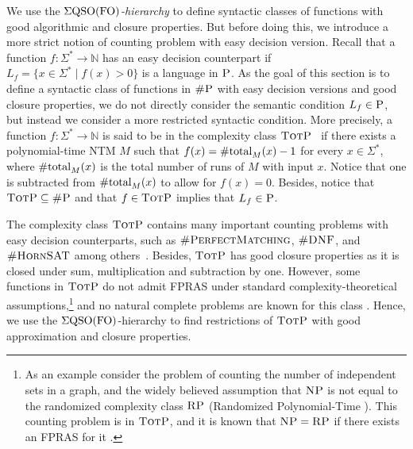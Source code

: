 
We use the \emph{$\Sigma{\rm QSO}({\rm FO})$-hierarchy} to define syntactic classes of functions with good algorithmic and closure properties.  
But before 
doing this, we introduce a more strict notion of counting problem with easy decision version.
Recall that a function $f : \Sigma^* \to \mathbb{N}$ has an easy decision counterpart if $L_f = \{ x \in \Sigma^* \mid f(x) > 0 \}$ is a language in $\text{\sc P}$. As the goal of this section is to define a syntactic class of functions in $\text{\sc \#P}$ with easy decision versions and good closure properties, we do not directly consider the semantic condition $L_f  \in \text{\sc P}$, but instead we consider a more restricted 
syntactic 
condition. More precisely, a function $f : \Sigma^* \to \mathbb{N}$ is said to be in the complexity class $\text{\sc TotP}$~\cite{PagourtzisZ06} if there exists a  polynomial-time NTM $M$ such that $f(x) = \text{\rm \#total}_M(x) - 1$ for every $x \in \Sigma^*$, where $\text{\rm \#total}_M(x)$ is the total number of runs of $M$ with input $x$. Notice that one is subtracted from $\text{\rm \#total}_M(x)$ to allow for $f(x) = 0$. Besides, notice that $\text{\sc TotP} \subseteq \text{\sc \#P}$ and that $f \in \text{\sc TotP}$ implies that $L_f \in \text{\sc P}$. 

The complexity class $\text{\sc TotP}$ contains many important counting problems with easy decision counterparts, such as $\textsc{\#PerfectMatching}$, $\textsc{\#DNF}$, and $\textsc{\#HornSAT}$ among others~\cite{PagourtzisZ06}. Besides, $\text{\sc TotP}$ has good closure properties as it is closed under sum, multiplication and subtraction by one. However, some functions in $\text{\sc TotP}$ do not admit FPRAS under standard complexity-theoretical assumptions,\footnote{As an example consider the problem of counting the number of independent sets in a graph, and the widely believed assumption that $\text{\sc NP}$ is not equal to the randomized complexity class $\text{\sc RP}$ (Randomized Polynomial-Time \cite{G77}). This counting problem is in $\text{\sc TotP}$, and it is known that $\text{\sc NP} = \text{\sc RP}$ if there exists an FPRAS for it \cite{DFJ02}.} and no natural complete problems are known for this class \cite{PagourtzisZ06}. Hence, we use the $\Sigma{\rm QSO}({\rm FO})$-hierarchy to find restrictions of $\text{\sc TotP}$ with good approximation and closure properties.


